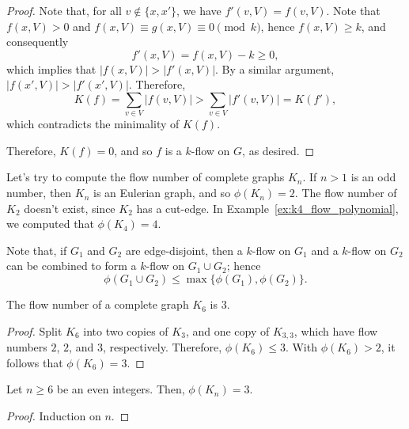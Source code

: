 \begin{proof}
	Note that, for all \(v \notin \{x, x'\}\), we have \(f'(v, V) = f(v, V)\).
	Note that \(f(x, V) > 0\) and \(f(x, V) \equiv g(x, V) \equiv 0 \pmod{k}\), hence \(f(x, V) \geq k\), and consequently
	\begin{equation}
		f'(x, V) = f(x, V) - k \geq 0,
	\end{equation}
	which implies that \(|f(x, V)| > |f'(x, V)|\).
	By a similar argument, \(|f(x', V)| > |f'(x', V)|\).
	Therefore,
	\begin{equation}
		K(f) = \sum_{v \in V} |f(v, V)| > \sum_{v \in V} |f'(v, V)| = K(f'),
	\end{equation}
	which contradicts the minimality of \(K(f)\).

	Therefore, \(K(f) = 0\), and so \(f\) is a \(k\)-flow on \(G\), as desired.
\end{proof}

Let's try to compute the flow number of complete graphs \(K_n\).
If \(n > 1\) is an odd number, then \(K_n\) is an Eulerian graph, and so \(\phi(K_n) = 2\).
The flow number of \(K_2\) doesn't exist, since \(K_2\) has a cut-edge.
In Example~\ref{ex:k4_flow_polynomial}, we computed that \(\phi(K_4) = 4\).

Note that, if \(G_1\) and \(G_2\) are edge-disjoint, then a \(k\)-flow on \(G_1\) and a \(k\)-flow on \(G_2\) can be combined to form a \(k\)-flow on \(G_1 \cup G_2\); hence
\begin{equation}
	\phi(G_1 \cup G_2) \leq \max\{\phi(G_1), \phi(G_2)\}.
\end{equation}

\begin{proposition}
	The flow number of a complete graph \(K_6\) is \(3\).
\end{proposition}

\begin{proof}
	Split \(K_6\) into two copies of \(K_3\), and one copy of \(K_{3, 3}\), which have flow numbers \(2\), \(2\), and \(3\), respectively.
	Therefore, \(\phi(K_6) \leq 3\).
	With \(\phi(K_6) > 2\), it follows that \(\phi(K_6) = 3\).
\end{proof}

\begin{theorem}
	Let \(n \geq 6\) be an even integers.
	Then, \(\phi(K_n) = 3\).
\end{theorem}

\begin{proof}
	Induction on \(n\).
\end{proof}


